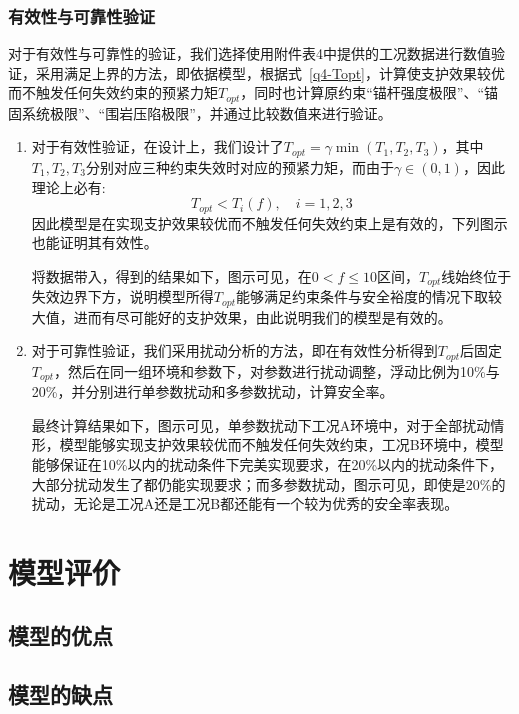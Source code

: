 \documentclass[UTF-8,a4paper,zihao=-4]{ctexart}
\begin{document}
\subsubsection{有效性与可靠性验证}
对于有效性与可靠性的验证，我们选择使用附件表4中提供的工况数据进行数值验证，采用满足上界的方法，即依据模型，根据式~\ref{q4-Topt}，计算使支护效果较优而不触发任何失效约束的预紧力矩$T_{opt}$，同时也计算原约束“锚杆强度极限”、“锚固系统极限”、“围岩压陷极限”，并通过比较数值来进行验证。
\begin{enumerate}
    \item 对于有效性验证，在设计上，我们设计了$T_{opt}=\gamma \min(T_1,T_2,T_3)$，其中$T_1,T_2,T_3$分别对应三种约束失效时对应的预紧力矩，而由于$\gamma \in (0,1)$，因此理论上必有:
    \begin{equation*}
        T_{opt}<T_i(f),\quad i=1,2,3
    \end{equation*}
    因此模型是在实现支护效果较优而不触发任何失效约束上是有效的，下列图示也能证明其有效性。
    
    将数据带入，得到的结果如下，图示可见，在$0<f\le10$区间，$T_{opt}$线始终位于失效边界下方，说明模型所得$T_{opt}$能够满足约束条件与安全裕度的情况下取较大值，进而有尽可能好的支护效果，由此说明我们的模型是有效的。

    \item 对于可靠性验证，我们采用扰动分析的方法，即在有效性分析得到$T_{opt}$后固定$T_{opt}$，然后在同一组环境和参数下，对参数进行扰动调整，浮动比例为10\%与20\%，并分别进行单参数扰动和多参数扰动，计算安全率。
    
    最终计算结果如下，图示可见，单参数扰动下工况A环境中，对于全部扰动情形，模型能够实现支护效果较优而不触发任何失效约束，工况B环境中，模型能够保证在10\%以内的扰动条件下完美实现要求，在20\%以内的扰动条件下，大部分扰动发生了都仍能实现要求；而多参数扰动，图示可见，即使是20\%的扰动，无论是工况A还是工况B都还能有一个较为优秀的安全率表现。
\end{enumerate}

\section{模型评价}
\subsection{模型的优点}

\subsection{模型的缺点}
\end{document}
